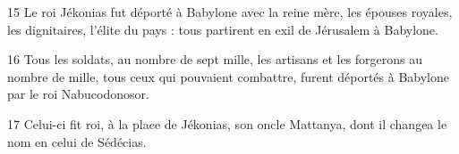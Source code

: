
15 Le roi Jékonias fut déporté à Babylone avec la reine mère, les épouses royales, les dignitaires, l’élite du pays : tous partirent en exil de Jérusalem à Babylone.

16 Tous les soldats, au nombre de sept mille, les artisans et les forgerons au nombre de mille, tous ceux qui pouvaient combattre, furent déportés à Babylone par le roi Nabucodonosor.

17 Celui-ci fit roi, à la place de Jékonias, son oncle Mattanya, dont il changea le nom en celui de Sédécias.